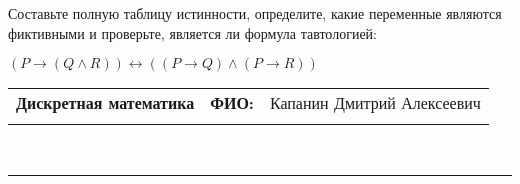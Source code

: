 \documentclass[10pt]{exam}
\newcommand{\class}{Дискретная математика}
\newcommand{\examdate}{}
\begin{document}
\begin{questions}
\begin{enumerate}[a)]
\end{enumerate}\question Составьте полную таблицу истинности, определите, какие переменные являются фиктивными и проверьте, является ли формула тавтологией:

$(P \rightarrow (Q \land R)) \leftrightarrow ((P \rightarrow Q) \land (P \rightarrow R))$

\end{questions}
\newpage
\begin{flushright}
\begin{tabular}{p{2.8in} r l}
\textbf{\class} & \textbf{ФИО:} &Капанин Дмитрий Алексеевич
\\

\textbf{\examdate} &&\\
\end{tabular}\\
\end{flushright}
\rule[1ex]{\textwidth}{.1pt}
\end{document}
